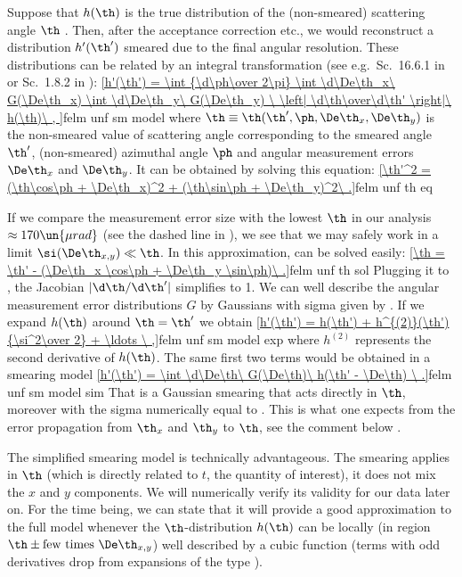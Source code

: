 Suppose that $h(\th)$ is the true distribution of the (non-smeared) scattering angle $\th$
. Then, after the acceptance correction etc., we would reconstruct a distribution $h'(\th')$ smeared due to the final angular resolution. These distributions can be related by an integral transformation (see e.g.~Sc.~16.6.1 in  or Sc.~1.8.2 in ):
\eqref{h'(\th') = \int {\d\ph\over 2\pi} \int \d\De\th_x\ G(\De\th_x) \int \d\De\th_y\ G(\De\th_y)
	\ \left| \d\th\over\d\th' \right|\ h(\th)\ ,
}{felm unf sm model}
where $\th \equiv \th(\th', \ph, \De\th_x, \De\th_y)$ is the non-smeared value of scattering angle corresponding to the smeared angle $\th'$, (non-smeared) azimuthal angle $\ph$ and angular measurement errors $\De\th_x$ and $\De\th_y$. It can be obtained by solving this equation:
\eqref{\th'^2 = (\th\cos\ph + \De\th_x)^2 + (\th\sin\ph + \De\th_y)^2\ .}{felm unf th eq}

If we compare the measurement error size  with the lowest $\th$ in our analysis $\approx 170\un{\mu rad}$ (see the dashed line in ), we see that we may safely work in a limit $\si(\De\th_{x, y}) \ll \th$. In this approximation,  can be solved easily:
\eqref{\th = \th' - (\De\th_x \cos\ph + \De\th_y \sin\ph)\ .}{felm unf th sol}
Plugging it to , the Jacobian $|\d\th/\d\th'|$ simplifies to 1. We can well describe the angular measurement error distributions $G$ by Gaussians with sigma given by . If we expand $h(\th)$ around $\th = \th'$ we obtain
\eqref{h'(\th') = h(\th') + h^{(2)}(\th') {\si^2\over 2} + \ldots \ ,}{felm unf sm model exp}
where $h^{(2)}$ represents the second derivative of $h(\th)$. The same first two terms would be obtained in a smearing model
\eqref{h'(\th') = \int \d\De\th\ G(\De\th)\ h(\th' - \De\th)  \ .}{felm unf sm model sim}
That is a Gaussian smearing that acts directly in $\th$, moreover with the sigma numerically equal to . This is what one expects from the error propagation from $\th_x$ and $\th_y$ to $\th$, see the comment below .

The simplified smearing model  is technically advantageous. The smearing applies in $\th$ (which is directly related to $t$, the quantity of interest), it does not mix the $x$ and $y$ components. We will numerically verify its validity for our data later on. For the time being, we can state that it will provide a good approximation to the full model  whenever the $\th$-distribution $h(\th)$ can be locally (in region $\th \pm \hbox{few times }\De\th_{x, y}$) well described by a cubic function (terms with odd derivatives drop from expansions of the type ).

